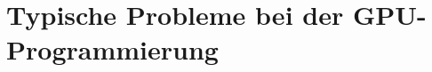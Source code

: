 \documentclass[journal]{IEEEtran}
\begin{document}
%
%


%





\section{Typische Probleme bei der GPU-Programmierung}
\end{document}
